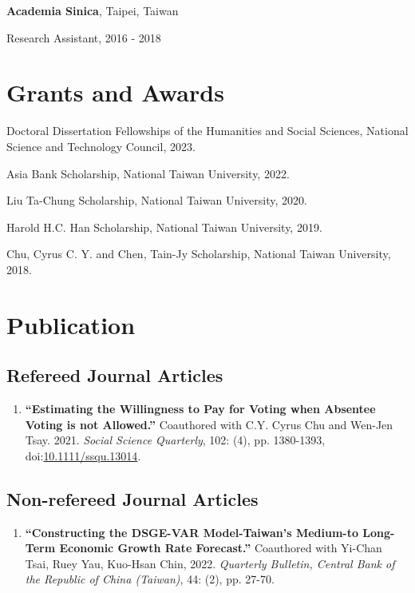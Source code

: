 \documentclass{article}
\newcommand{\cvsection}[1]{\section*{\rmfamily#1}}
\newcommand{\cvsubsection}[1]{\subsection*{\rmfamily\hspace{1.6em}#1}}
\begin{document}
\textbf{Academia Sinica}, Taipei, Taiwan

\hspace{2em}Research Assistant, 2016 - 2018








\cvsection{Grants and Awards}
\indent

Doctoral Dissertation Fellowships of the Humanities and Social Sciences, National Science and Technology Council, 2023.

Asia Bank Scholarship, National Taiwan University, 2022.

Liu Ta-Chung Scholarship, National Taiwan University, 2020.

Harold H.C. Han Scholarship, National Taiwan University, 2019.

Chu, Cyrus C. Y. and Chen, Tain-Jy Scholarship, National Taiwan University, 2018.

\section*{Publication}

\cvsubsection{Refereed Journal Articles}

\begin{enumerate}[resume]
    \item \textbf{“Estimating the Willingness to Pay for Voting when Absentee Voting is not Allowed.”} Coauthored with C.Y. Cyrus Chu and Wen-Jen Tsay. 2021. \textit{Social Science Quarterly}, 102: (4), pp. 1380-1393,\\ doi:\href{https://doi.org/10.1111/ssqu.13014}{10.1111/ssqu.13014}.
\end{enumerate}


\cvsubsection{Non-refereed Journal Articles}

\begin{enumerate}[resume]
    \item \textbf{“Constructing the DSGE-VAR Model-Taiwan's Medium-to Long-Term Economic Growth Rate Forecast.”} Coauthored with Yi-Chan Tsai, Ruey Yau, Kuo-Hsan Chin, 2022. \textit{Quarterly Bulletin, Central Bank of the Republic of China (Taiwan)}, 44: (2), pp. 27-70.
\end{enumerate}
\end{document}
